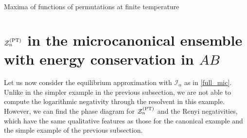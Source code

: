 \documentclass[a4paper,11pt]{article}
\newcommand{\be}{\begin{equation}}
\newcommand{\ee}{\end{equation}}
\newcommand\al{{\alpha}}
\newcommand\sI{{\ensuremath{{\mathcal I}}}}
\newcommand\sZ{{\mathcal Z}}
\begin{document}
\begin{enumerate}
\begin{appendix}
\begin{section}{Maxima of functions of permutations at finite temperature}
\begin{enumerate}
\begin{comment} 
Next, let us argue that $\left(G(\beta, \eta\tau)+ G(\beta, \eta^{-1}\tau)\right)$ is maximized for even $n$ by four permutations: $\tau= \eta, \eta^{-1}$ and $\tau_{ES}= \{(12)(34)...(n-1~n),~ (23)(45)...(n1)\}$, and for odd $n$ by two permutations: $\tau= \eta, \eta^{-1}$. I seemed to observe this numerically, but am not sure yet of how to show it. If we apply the above argument based on \eqref{P_eq} and the following assumption to this case, say for even $n$, it tells us that 
\be 
G(\eta \tau) + G(\eta^{-1}\tau) \leq (n+1)f(\beta) + f((n-1)\beta) \label{max_1}
\ee
But this cannot be realized for any actual $\tau$, as it would require one out of $\eta \tau$ or $\eta \tau^{-1}$ to have $n$ one-cycles and the other to have one 1-cycle and one $(n-1)$ cycle. But the only permutation with $n$ one-cycles is $e$, so if $\eta \tau$ has $n$ one-cycles, then $\eta \tau^{-1}$ necessarily has two $n/2$-cycles. What we seem to find in practice for the actual maximum value is 
\be 
G(\eta \tau) + G(\eta^{-1}\tau) \leq n f(\beta) + 2f\left(\frac{n}{2}\beta\right) \label{max_2}
\ee
But \eqref{max_1} does not imply \eqref{max_2}, as in fact using the concavity of $f$, we have instead 
\be 
f\left(\frac{n}{2}\beta\right) \leq \frac{1}{2}\left( f(\beta) + f\left( (n-1)\beta \right)\right)
\ee
There might be some way of arguing that the RHS of \eqref{max_2} is the closest we can actually get to \eqref{max_1}. In cases where can write all $c_i$ as 
\be 
c_i = \lambda + (1-\lambda) \frac{n}{2}
\ee
for $\lambda$ between 0 and 1, an argument similar to the one above does imply \eqref{max_2}. But since in some cases the $c_i$ can be larger than $n/2$, we need something further. 
\end{comment} 

\end{enumerate} 


\end{section} 


\section{$\sZ_n^{\rm (PT)}$ in the microcanonical ensemble with energy conservation in $AB$} \label{app:mic_hom} 

Let us now consider the equilibrium approximation with $\sI_{\al}$ as in \eqref{full_mic}. Unlike in the simpler example in the previous subsection, we are not able to compute the logarithmic negativity through the resolvent in this example. However, we can find the phase diagram for 
$\sZ_n^{\rm (PT)}$ and the Renyi negativities, which have the same qualitative features as those for the canonical example and the simple example of the previous subsection. 
 

\end{appendix}
\end{enumerate}
\end{document}
